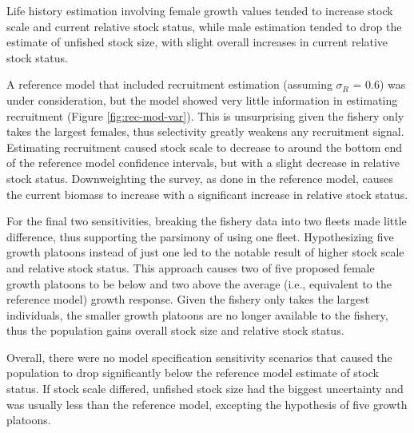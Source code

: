 \documentclass[11pt,
  english,
  a4paper,
]{article}
\begin{document}
\leavevmode\tagmcend\tagstructend\par


Life history estimation involving female growth values tended to increase stock scale and current relative stock status, while male estimation tended to drop the estimate of unfished stock size, with slight overall increases in current relative stock status.

\leavevmode\tagmcend\tagstructend\par


A reference model that included recruitment estimation (assuming {\(\sigma_R\)\leavevmode\tagmcend\tagstructend} = 0.6) was under consideration, but the model showed very little information in estimating recruitment (Figure \ref{fig:rec-mod-var}). This is unsurprising given the fishery only takes the largest females, thus selectivity greatly weakens any recruitment signal. Estimating recruitment caused stock scale to decrease to around the bottom end of the reference model confidence intervals, but with a slight decrease in relative stock status. Downweighting the survey, as done in the reference model, causes the current biomass to increase with a significant increase in relative stock status.

\leavevmode\tagmcend\tagstructend\par


For the final two sensitivities, breaking the fishery data into two fleets made little difference, thus supporting the parsimony of using one fleet. Hypothesizing five growth platoons instead of just one led to the notable result of higher stock scale and relative stock status. This approach causes two of five proposed female growth platoons to be below and two above the average (i.e., equivalent to the reference model) growth response. Given the fishery only takes the largest individuals, the smaller growth platoons are no longer available to the fishery, thus the population gains overall stock size and relative stock status.

\leavevmode\tagmcend\tagstructend\par


Overall, there were no model specification sensitivity scenarios that caused the population to drop significantly below the reference model estimate of stock status. If stock scale differed, unfished stock size had the biggest uncertainty and was usually less than the reference model, excepting the hypothesis of five growth platoons.
\end{document}
